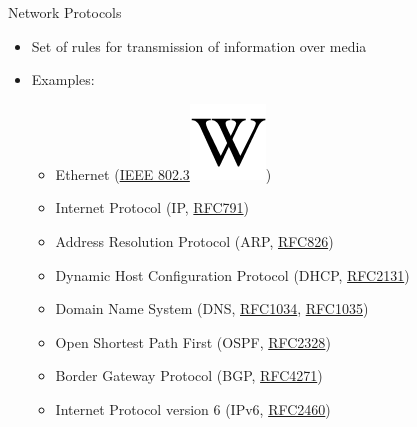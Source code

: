 \begin{frame}{Network Protocols}
	\begin{itemize}[<+->]
		\item Set of rules for transmission of information over media
		\item Examples:
		\begin{itemize}
			\item Ethernet (\href{https://en.wikipedia.org/wiki/IEEE_802.3}{IEEE 802.3\includegraphics[scale=0.21]{../common/images/wiki_letter.png}})
			\item Internet Protocol (IP, \href{https://tools.ietf.org/html/rfc791}{RFC791})
			\item Address Resolution Protocol (ARP, \href{https://tools.ietf.org/html/rfc826}{RFC826})
			\item Dynamic Host Configuration Protocol (DHCP, \href{https://tools.ietf.org/html/rfc2131}{RFC2131})
			\item Domain Name System (DNS, \href{https://tools.ietf.org/html/rfc1034}{RFC1034}, \href{https://tools.ietf.org/html/rfc1035}{RFC1035})
			\item Open Shortest Path First (OSPF, \href{https://tools.ietf.org/html/rfc2328}{RFC2328})
			\item Border Gateway Protocol (BGP, \href{https://tools.ietf.org/html/rfc4271}{RFC4271})
			\item Internet Protocol version 6 (IPv6, \href{https://tools.ietf.org/html/rfc2460}{RFC2460})
		\end{itemize}
	\end{itemize}
\end{frame}
